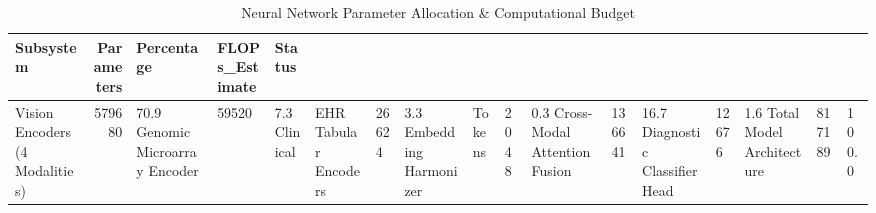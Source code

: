\begin{table}
\caption{Neural Network Parameter Allocation & Computational Budget}
\begin{tabular}{lrlll}
\toprule
Subsystem & Parameters & Percentage & FLOPs_Estimate & Status \\
\midrule
Vision Encoders (4 Modalities) & 579680 & 70.9%
Genomic Microarray Encoder & 59520 & 7.3%
Clinical & EHR Tabular Encoders & 26624 & 3.3%
Embedding Harmonizer & Tokens & 2048 & 0.3%
Cross-Modal Attention Fusion & 136641 & 16.7%
Diagnostic Classifier Head & 12676 & 1.6%
Total Model Architecture & 817189 & 100.0%
\bottomrule
\end{tabular}
\end{table}
